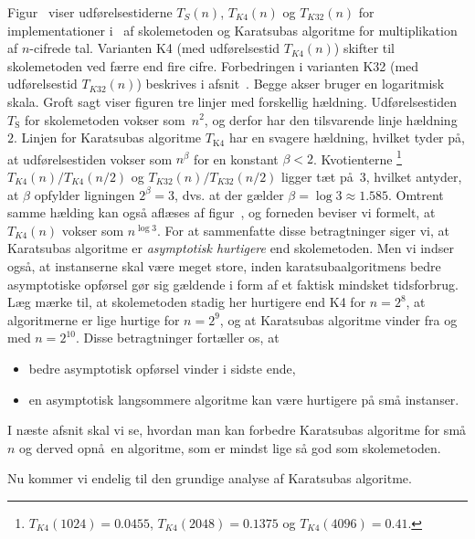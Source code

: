 %
Figur~ viser udførelsestiderne 
$T_S(n)$, $T_{K4}(n)$ og  $T_{K32}(n)$ for implementationer i \CC\ af skolemetoden og Karatsubas algoritme for multiplikation af $n$-cifrede tal.
Varianten K4 (med udførelsestid $T_{K4}(n)$) skifter til skolemetoden ved færre end fire cifre.
Forbedringen i varianten K32 (med udførelsestid $T_{K32}(n)$) beskrives i
afsnit~.
Begge akser bruger en logaritmisk skala.
Groft sagt viser figuren tre linjer med forskellig hældning.
Udførelsestiden $T_\mathrm S$ for skolemetoden vokser som~$n^2$, og derfor har den tilsvarende linje hældning~$2$.
Linjen for  Karatsubas algoritme $T_{\mathrm K4}$ har en svagere hældning, hvilket tyder på, at udførelsestiden vokser som $n^\beta$ for en konstant $\beta < 2$.
Kvotienterne \footnote{$T_{K4}(1024) = \num{0.0455}$,
$T_{K4}(2048) = \num{0.1375}$ og $T_{K4}(4096) = \num{0.41}$.} 
$T_{K4}(n)/T_{K4}(n/2)$ 
og $T_{K32}(n)/T_{K32}(n/2)$ ligger tæt på~$3$, hvilket antyder, at $\beta$  opfylder ligningen $2^\beta = 3$, dvs. at der gælder $\beta = \log 3 \approx \num{1.585}$.    
Omtrent samme hælding kan også aflæses af figur~, og forneden beviser vi formelt, at $T_{K4}(n)$ vokser som  
$n^{\log 3}$.
For at sammenfatte disse betragtninger siger vi, at Karatsubas algoritme er \emph{asymptotisk hurtigere} 
end skolemetoden.
Men vi indser også, at instanserne skal være meget store, inden karatsubaalgoritmens bedre asymptotiske opførsel gør sig gældende i form af et faktisk mindsket tidsforbrug.
Læg mærke til, at skolemetoden stadig her hurtigere end K4 for $n=2^8$, at algoritmerne er lige hurtige for $n=2^9$, og at Karatsubas algoritme vinder fra og med $n=2^{10}$.
Disse betragtninger fortæller os, at
\begin{itemize}
\item bedre asymptotisk opførsel vinder i sidste ende,
\item en asymptotisk langsommere algoritme kan være hurtigere på små instanser.
\end{itemize}
I næste afsnit skal vi se, hvordan man kan forbedre Karatsubas algoritme for små $n$ og derved opnå en algoritme, som er mindst lige så god som skolemetoden. 

Nu kommer vi  endelig til den grundige analyse af Karatsubas algoritme.

